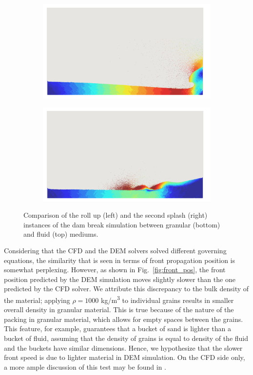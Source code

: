 \begin{figure}[H]
	\begin{subfigure}{0.45 \textwidth}	
		\centering
		\includegraphics[width=1.0\textwidth]{images/CFD_DEM/dem_rollup.png}
	\end{subfigure}
	\begin{subfigure}{0.45 \textwidth}
		\centering
		\includegraphics[width=1.0\textwidth]{images/CFD_DEM/dem_secondSplash.png}
	\end{subfigure}	
	\caption{Comparison of the roll up (left) and the second splash (right) instances of the dam break simulation between granular (bottom) and fluid (top) mediums.}	\label{fig:dambreak}
\end{figure} 
Considering that the CFD and the DEM solvers solved different governing equations, the similarity that is seen in terms of front propagation position is somewhat perplexing. However, as shown in Fig.~\ref{fig:front_pos}, the front position predicted by the DEM simulation moves slightly slower than the one predicted by the CFD solver. We attribute this discrepancy to the bulk density of the material; applying $\rho=1000$ \si{kg/m^3} to individual grains results in smaller overall density in granular material. This is true because of the nature of the packing in granular material, which allows for empty spaces between the grains. This feature, for example, guarantees that a bucket of sand is lighter than a bucket of fluid, assuming that the density of grains is equal to density of the fluid and the buckets have similar dimensions. Hence, we hypothesize that the slower front speed is due to lighter material in DEM simulation. On the CFD side only, a more ample discussion of this test may be found in \cite{Adami2012,miladHalfImplicit2018}.

